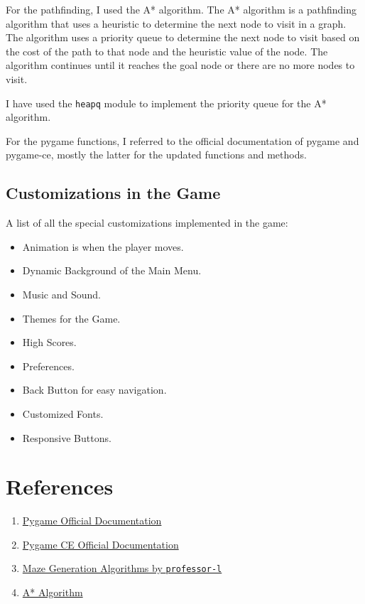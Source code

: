 \documentclass{article}
\begin{document}
For the pathfinding, I used the A* algorithm. The A* algorithm is a pathfinding algorithm that uses a heuristic to determine the next node to visit in a graph. The algorithm uses a priority queue to determine the next node to visit based on the cost of the path to that node and the heuristic value of the node. The algorithm continues until it reaches the goal node or there are no more nodes to visit.

I have used the \texttt{heapq} module to implement the priority queue for the A* algorithm.

For the pygame functions, I referred to the official documentation of pygame and pygame-ce, mostly the latter for the updated functions and methods.

\subsection{Customizations in the Game}
A list of all the special customizations implemented in the game:

\begin{itemize}
    \item Animation is when the player moves.
    \item Dynamic Background of the Main Menu.
    \item Music and Sound.
    \item Themes for the Game.
    \item High Scores.
    \item Preferences.
    \item Back Button for easy navigation.
    \item Customized Fonts.
    \item Responsive Buttons.
\end{itemize}

\section{References}
\begin{enumerate}
    \item \href{https://www.pygame.org/docs/}{Pygame Official Documentation}
    \item \href{https://pyga.me/docs/}{Pygame CE Official Documentation}
    \item \href{https://professor-l.github.io/mazes/}{Maze Generation Algorithms by \texttt{professor-l}}
    \item \href{OtherResources/A*.md}{A* Algorithm}
\end{enumerate}
\end{document}
